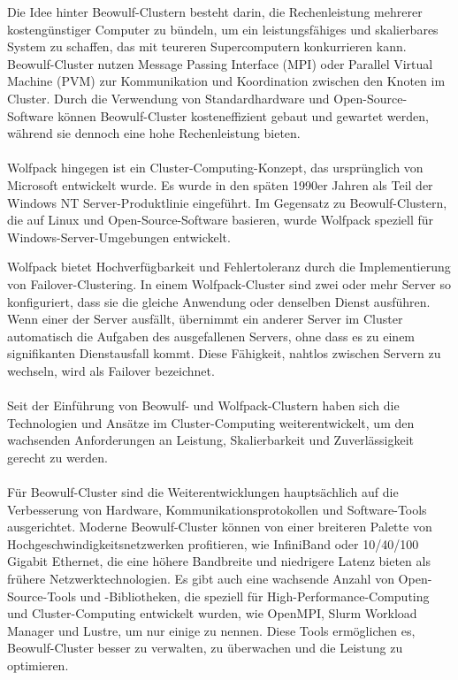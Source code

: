 Die Idee hinter Beowulf-Clustern besteht darin, die Rechenleistung mehrerer kostengünstiger Computer zu bündeln, um ein leistungsfähiges und skalierbares System zu schaffen, das mit teureren Supercomputern konkurrieren kann. Beowulf-Cluster nutzen Message Passing Interface (MPI) oder Parallel Virtual Machine (PVM) zur Kommunikation und Koordination zwischen den Knoten im Cluster. Durch die Verwendung von Standardhardware und Open-Source-Software können Beowulf-Cluster kosteneffizient gebaut und gewartet werden, während sie dennoch eine hohe Rechenleistung bieten.
\\\\
Wolfpack hingegen ist ein Cluster-Computing-Konzept, das ursprünglich von Microsoft entwickelt wurde. Es wurde in den späten 1990er Jahren als Teil der Windows NT Server-Produktlinie eingeführt. Im Gegensatz zu Beowulf-Clustern, die auf Linux und Open-Source-Software basieren, wurde Wolfpack speziell für Windows-Server-Umgebungen entwickelt.

Wolfpack bietet Hochverfügbarkeit und Fehlertoleranz durch die Implementierung von Failover-Clustering. In einem Wolfpack-Cluster sind zwei oder mehr Server so konfiguriert, dass sie die gleiche Anwendung oder denselben Dienst ausführen. Wenn einer der Server ausfällt, übernimmt ein anderer Server im Cluster automatisch die Aufgaben des ausgefallenen Servers, ohne dass es zu einem signifikanten Dienstausfall kommt. Diese Fähigkeit, nahtlos zwischen Servern zu wechseln, wird als Failover bezeichnet.
\\\\
Seit der Einführung von Beowulf- und Wolfpack-Clustern haben sich die Technologien und Ansätze im Cluster-Computing weiterentwickelt, um den wachsenden Anforderungen an Leistung, Skalierbarkeit und Zuverlässigkeit gerecht zu werden.
\\\\
Für Beowulf-Cluster sind die Weiterentwicklungen hauptsächlich auf die Verbesserung von Hardware, Kommunikationsprotokollen und Software-Tools ausgerichtet. Moderne Beowulf-Cluster können von einer breiteren Palette von Hochgeschwindigkeitsnetzwerken profitieren, wie InfiniBand oder 10/40/100 Gigabit Ethernet, die eine höhere Bandbreite und niedrigere Latenz bieten als frühere Netzwerktechnologien. Es gibt auch eine wachsende Anzahl von Open-Source-Tools und -Bibliotheken, die speziell für High-Performance-Computing und Cluster-Computing entwickelt wurden, wie OpenMPI, Slurm Workload Manager und Lustre, um nur einige zu nennen. Diese Tools ermöglichen es, Beowulf-Cluster besser zu verwalten, zu überwachen und die Leistung zu optimieren.

